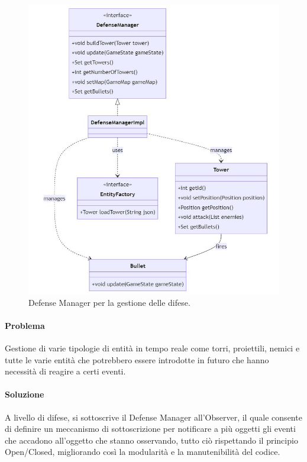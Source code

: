 \documentclass[a4paper,12pt]{report}
\begin{document}
\begin{figure}[H]
    \centering
    \includegraphics[width=0.8\linewidth]{defense_manager}
    \caption{Defense Manager per la gestione delle difese.}
    \label{fig:defense_manager}
\end{figure}

\vspace{50mm}
\paragraph{Problema}
Gestione di varie tipologie di entità in tempo reale come torri, proiettili, nemici e tutte le varie entità che potrebbero essere introdotte in futuro che hanno necessità di reagire a certi eventi.
\paragraph{Soluzione}
A livello di difese, si sottoscrive il Defense Manager all'Observer, il quale consente di definire un meccanismo di sottoscrizione per notificare a più oggetti gli eventi che accadono all'oggetto che stanno osservando, tutto ciò rispettando il principio Open/Closed, migliorando così la modularità e la manutenibilità del codice.
\end{document}
